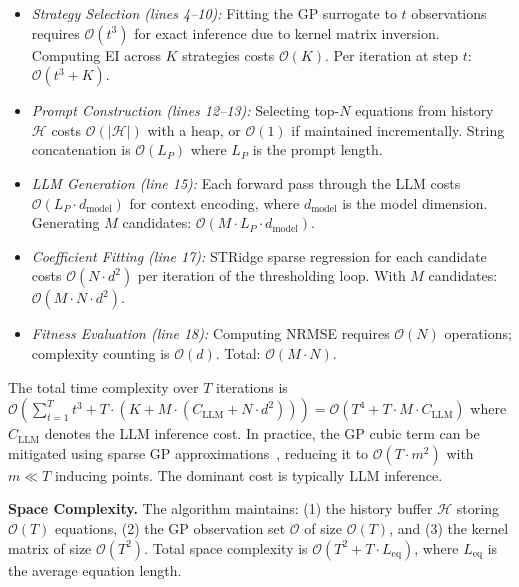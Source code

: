 \documentclass[twoside,11pt]{article}
\let\cite\citep
\newcommand{\1}{{\bf 1}}
\newcommand{\0}{{\bf 0}}
\begin{document}
\begin{itemize}
    \item \textit{Strategy Selection (lines 4--10):} Fitting the GP surrogate to $t$ observations requires $\mathcal{O}(t^3)$ for exact inference due to kernel matrix inversion. Computing EI across $K$ strategies costs $\mathcal{O}(K)$. Per iteration at step $t$: $\mathcal{O}(t^3 + K)$.
    
    \item \textit{Prompt Construction (lines 12--13):} Selecting top-$N$ equations from history $\mathcal{H}$ costs $\mathcal{O}(|\mathcal{H}|)$ with a heap, or $\mathcal{O}(1)$ if maintained incrementally. String concatenation is $\mathcal{O}(L_P)$ where $L_P$ is the prompt length.
    
    \item \textit{LLM Generation (line 15):} Each forward pass through the LLM costs $\mathcal{O}(L_P \cdot d_{\text{model}})$ for context encoding, where $d_{\text{model}}$ is the model dimension. Generating $M$ candidates: $\mathcal{O}(M \cdot L_P \cdot d_{\text{model}})$.
    
    \item \textit{Coefficient Fitting (line 17):} STRidge sparse regression for each candidate costs $\mathcal{O}(N \cdot d^2)$ per iteration of the thresholding loop. With $M$ candidates: $\mathcal{O}(M \cdot N \cdot d^2)$.
    
    \item \textit{Fitness Evaluation (line 18):} Computing NRMSE requires $\mathcal{O}(N)$ operations; complexity counting is $\mathcal{O}(d)$. Total: $\mathcal{O}(M \cdot N)$.
\end{itemize}

The total time complexity over $T$ iterations is $\mathcal{O}\left(\sum_{t=1}^{T} t^3 + T \cdot \left(K + M \cdot (C_{\text{LLM}} + N \cdot d^2)\right)\right) = \mathcal{O}(T^4 + T \cdot M \cdot C_{\text{LLM}})$ where $C_{\text{LLM}}$ denotes the LLM inference cost. In practice, the GP cubic term can be mitigated using sparse GP approximations~\cite{quinonero2005unifying}, reducing it to $\mathcal{O}(T \cdot m^2)$ with $m \ll T$ inducing points. The dominant cost is typically LLM inference.

\textbf{Space Complexity.} The algorithm maintains: (1) the history buffer $\mathcal{H}$ storing $\mathcal{O}(T)$ equations, (2) the GP observation set $\mathcal{O}$ of size $\mathcal{O}(T)$, and (3) the kernel matrix of size $\mathcal{O}(T^2)$. Total space complexity is $\mathcal{O}(T^2 + T \cdot L_{\text{eq}})$, where $L_{\text{eq}}$ is the average equation length.
\end{document}
